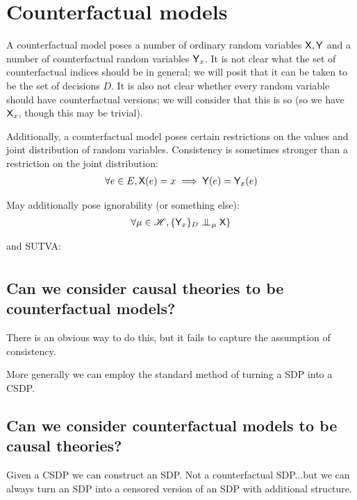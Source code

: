 
\section{Counterfactual models}

A counterfactual model poses a number of ordinary random variables $\mathsf{X}, \mathsf{Y}$ and a number of counterfactual random variables $\mathsf{Y}_x$. It is not clear what the set of counterfactual indices should be in general; we will posit that it can be taken to be the set of decisions $D$. It is also not clear whether every random variable should have counterfactual versions; we will consider that this is so (so we have $\mathsf{X}_x$, though this may be trivial).

Additionally, a counterfactual model poses certain restrictions on the values and joint distribution of random variables. Consistency is sometimes stronger than a restriction on the joint distribution:
\begin{align}
\forall e\in E, \mathsf{X}(e) = x\implies \mathsf{Y}(e) = \mathsf{Y}_x (e)
\end{align}

May additionally pose ignorability (or something else):
\begin{align}
\forall \mu\in \mathscr{H}, \{\RV{Y}_x\}_{D} \CI_\mu \RV{X}\}
\end{align}

and SUTVA:
\begin{align}

\end{align}

\subsection{Can we consider causal theories to be counterfactual models?}

There is an obvious way to do this, but it fails to capture the assumption of consistency.

More generally we can employ the standard method of turning a SDP into a CSDP.

\subsection{Can we consider counterfactual models to be causal theories?}

Given a CSDP we can construct an SDP. Not a counterfactual SDP...but we can always turn an SDP into a censored version of an SDP with additional structure. 

